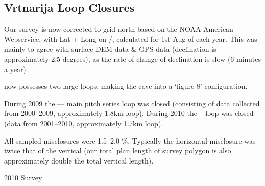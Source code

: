 \subsection{Vrtnarija Loop Closures}

Our survey is now corrected to grid north based on the NOAA American
Webservice, with Lat + Long on /, calculated for 1st Aug of each year.
This was mainly to agree with surface DEM data \& GPS data (declination is
approximately 2.5 degrees), as the rate of change of declination is slow (6
minutes a year).

 now possesses two large loops, making the cave into a `figure 8' configuration. 

During 2009 the  --- main pitch series loop was closed
(consisting of data collected from 2000--2009, approximately 1.8km loop).
During 2010 the  --  loop was closed (data from
2001--2010, approximately 1.7km loop).

All sampled misclosures were 1.5--2.0 \%. Typically the horizontal misclosure
was twice that of the vertical (our total plan length of survey polygon is also
approximately double the total vertical length).




\begin{pagesurvey}
\centering
{}
\caption[2010 Vrtnarija Survey]{2010  Survey}
\end{pagesurvey}



